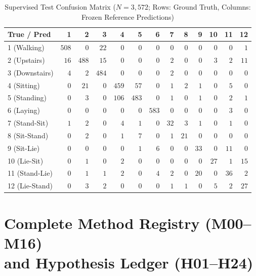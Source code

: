 \documentclass[11pt,oneside,a4paper]{report}
\theoremstyle{remark}
\begin{document}
\begin{table}[htbp]
\centering\small
\caption{Supervised Test Confusion Matrix ($N = 3,572$; Rows: Ground Truth, Columns: Frozen Reference Predictions)}
\label{tab:app_confusion}
\begin{tabularx}{\textwidth}{@{}Yrrrrrrrrrrrr@{}}
\toprule
\textbf{True / Pred} & \textbf{1} & \textbf{2} & \textbf{3} & \textbf{4} & \textbf{5} & \textbf{6} & \textbf{7} & \textbf{8} & \textbf{9} & \textbf{10} & \textbf{11} & \textbf{12} \\
 (Walking) & $508$ & $0$ & $22$ & $0$ & $0$ & $0$ & $0$ & $0$ & $0$ & $0$ & $0$ & $1$ \\
2 (Upstairs) & $16$ & $488$ & $15$ & $0$ & $0$ & $0$ & $2$ & $0$ & $0$ & $3$ & $2$ & $11$ \\
3 (Downstairs) & $4$ & $2$ & $484$ & $0$ & $0$ & $0$ & $2$ & $0$ & $0$ & $0$ & $0$ & $0$ \\
4 (Sitting) & $0$ & $21$ & $0$ & $459$ & $57$ & $0$ & $1$ & $2$ & $1$ & $0$ & $5$ & $0$ \\
5 (Standing) & $0$ & $3$ & $0$ & $106$ & $483$ & $0$ & $1$ & $0$ & $1$ & $0$ & $2$ & $1$ \\
6 (Laying) & $0$ & $0$ & $0$ & $0$ & $0$ & $583$ & $0$ & $0$ & $0$ & $0$ & $3$ & $0$ \\
7 (Stand-Sit) & $1$ & $2$ & $0$ & $4$ & $1$ & $0$ & $32$ & $3$ & $1$ & $0$ & $1$ & $0$ \\
8 (Sit-Stand) & $0$ & $2$ & $0$ & $1$ & $7$ & $0$ & $1$ & $21$ & $0$ & $0$ & $0$ & $0$ \\
9 (Sit-Lie) & $0$ & $0$ & $0$ & $0$ & $1$ & $6$ & $0$ & $0$ & $33$ & $0$ & $11$ & $0$ \\
10 (Lie-Sit) & $0$ & $1$ & $0$ & $2$ & $0$ & $0$ & $0$ & $0$ & $0$ & $27$ & $1$ & $15$ \\
11 (Stand-Lie) & $0$ & $1$ & $1$ & $2$ & $0$ & $4$ & $2$ & $0$ & $20$ & $0$ & $36$ & $2$ \\
12 (Lie-Stand) & $0$ & $3$ & $2$ & $0$ & $0$ & $0$ & $1$ & $1$ & $0$ & $5$ & $2$ & $27$ \\
\bottomrule
\end{tabularx}
\end{table}

\chapter[Complete Method Registry (M00--M16) and Hypothesis Ledger (H01--H24)]{Complete Method Registry (M00--M16)\\and Hypothesis Ledger (H01--H24)}
\label{app:registry}
\end{document}

